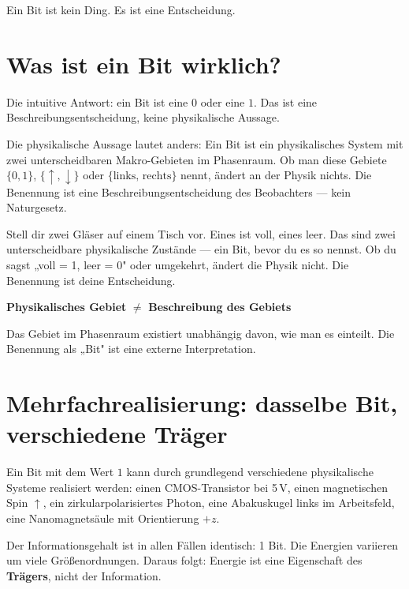 
\epigraph{Ein Bit ist kein Ding. Es ist eine Entscheidung.}{}

\section{Was ist ein Bit wirklich?}

Die intuitive Antwort: ein Bit ist eine $0$ oder eine $1$. Das ist eine
Beschreibungsentscheidung, keine physikalische Aussage.

Die physikalische Aussage lautet anders: Ein Bit ist ein physikalisches
System mit zwei unterscheidbaren Makro-Gebieten im Phasenraum. 
Ob man diese Gebiete $\{0, 1\}$, $\{\uparrow, \downarrow\}$ oder
$\{\text{links, rechts}\}$ nennt, ändert an der Physik nichts. Die Benennung
ist eine Beschreibungsentscheidung des Beobachters --- kein Naturgesetz.

\begin{laierspur}
Stell dir zwei Gläser auf einem Tisch vor. Eines ist voll, eines leer.
Das sind zwei unterscheidbare physikalische Zustände --- ein Bit,
bevor du es so nennst. Ob du sagst „voll = 1, leer = 0" oder umgekehrt,
ändert die Physik nicht. Die Benennung ist deine Entscheidung.
\end{laierspur}

\begin{keyresult}[Kernunterscheidung]
\textbf{Physikalisches Gebiet} $\neq$ \textbf{Beschreibung des Gebiets} 

Das Gebiet im Phasenraum existiert unabhängig davon, wie man es einteilt.
Die Benennung als „Bit" ist eine externe Interpretation.
\end{keyresult}

\section{Mehrfachrealisierung: dasselbe Bit, verschiedene Träger}

Ein Bit mit dem Wert $1$ kann durch grundlegend verschiedene physikalische
Systeme realisiert werden: einen CMOS-Transistor bei 5\,V, einen magnetischen
Spin $\uparrow$, ein zirkularpolarisiertes Photon, eine Abakuskugel links im
Arbeitsfeld, eine Nanomagnetsäule mit Orientierung $+z$.

Der Informationsgehalt ist in allen Fällen identisch: 1 Bit. Die Energien
variieren um viele Größenordnungen. Daraus folgt: Energie ist eine
Eigenschaft des \textbf{Trägers}, nicht der Information. 

